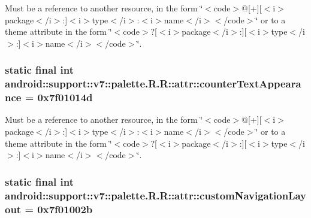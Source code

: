 Must be a reference to another resource, in the form \char`\"{}$<$code$>$@\mbox{[}+\mbox{]}\mbox{[}$<$i$>$package$<$/i$>$:\mbox{]}$<$i$>$type$<$/i$>$:$<$i$>$name$<$/i$>$$<$/code$>$\char`\"{} or to a theme attribute in the form \char`\"{}$<$code$>$?\mbox{[}$<$i$>$package$<$/i$>$:\mbox{]}\mbox{[}$<$i$>$type$<$/i$>$:\mbox{]}$<$i$>$name$<$/i$>$$<$/code$>$\char`\"{}. \hypertarget{classandroid_1_1support_1_1v7_1_1palette_1_1_r_1_1attr_7c5e26080cd9d97e95a399db3f1ff6bf}{
\subsubsection[{counterTextAppearance}]{\setlength{\rightskip}{0pt plus 5cm}static final int android::support::v7::palette.R.R::attr::counterTextAppearance = 0x7f01014d}}
\label{classandroid_1_1support_1_1v7_1_1palette_1_1_r_1_1attr_7c5e26080cd9d97e95a399db3f1ff6bf}


Must be a reference to another resource, in the form \char`\"{}$<$code$>$@\mbox{[}+\mbox{]}\mbox{[}$<$i$>$package$<$/i$>$:\mbox{]}$<$i$>$type$<$/i$>$:$<$i$>$name$<$/i$>$$<$/code$>$\char`\"{} or to a theme attribute in the form \char`\"{}$<$code$>$?\mbox{[}$<$i$>$package$<$/i$>$:\mbox{]}\mbox{[}$<$i$>$type$<$/i$>$:\mbox{]}$<$i$>$name$<$/i$>$$<$/code$>$\char`\"{}. \hypertarget{classandroid_1_1support_1_1v7_1_1palette_1_1_r_1_1attr_ca883b08c0e9c51ab35a2b7b9578205b}{
\subsubsection[{customNavigationLayout}]{\setlength{\rightskip}{0pt plus 5cm}static final int android::support::v7::palette.R.R::attr::customNavigationLayout = 0x7f01002b}}
\label{classandroid_1_1support_1_1v7_1_1palette_1_1_r_1_1attr_ca883b08c0e9c51ab35a2b7b9578205b}


